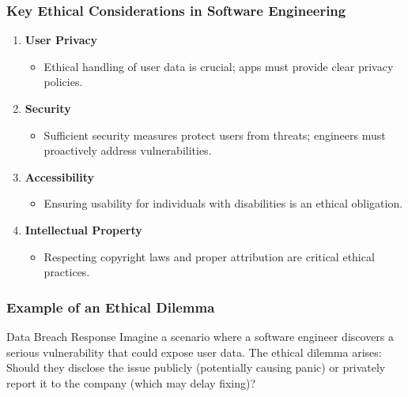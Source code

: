 \documentclass{beamer}
\begin{document}
\begin{frame}[fragile]
    \frametitle{Key Ethical Considerations in Software Engineering}
    \begin{enumerate}
        \item \textbf{User Privacy}
        \begin{itemize}
            \item Ethical handling of user data is crucial; apps must provide clear privacy policies.
        \end{itemize}

        \item \textbf{Security}
        \begin{itemize}
            \item Sufficient security measures protect users from threats; engineers must proactively address vulnerabilities.
        \end{itemize}

        \item \textbf{Accessibility}
        \begin{itemize}
            \item Ensuring usability for individuals with disabilities is an ethical obligation.
        \end{itemize}

        \item \textbf{Intellectual Property}
        \begin{itemize}
            \item Respecting copyright laws and proper attribution are critical ethical practices.
        \end{itemize}
    \end{enumerate}
\end{frame}

\begin{frame}[fragile]
    \frametitle{Example of an Ethical Dilemma}
    \begin{block}{Data Breach Response}
        Imagine a scenario where a software engineer discovers a serious vulnerability that could expose user data. The ethical dilemma arises: Should they disclose the issue publicly (potentially causing panic) or privately report it to the company (which may delay fixing)?
    \end{block}
\end{frame}
\end{document}

